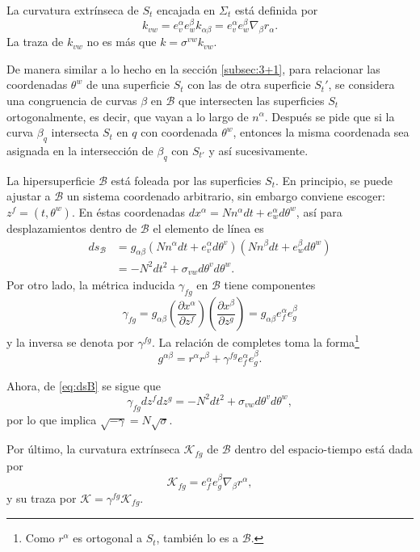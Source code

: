 La curvatura extr\'{i}nseca de $S_{t}$ encajada en $\Sigma_t$ est\'{a} definida por
%
\begin{equation}
\label{eq:extrinseccurvSt}
k_{vw} = e^{\alpha}_{v} e^{\beta}_{w} k_{\alpha \beta} = e^{\alpha}_{v} e^{\beta}_{w} \nabla_{\beta} r_{\alpha}.
\end{equation}
%
La traza de $k_{vw}$ no es m\'{a}s que $k = \sigma^{vw} k_{vw}$.

De manera similar a lo hecho en la secci\'{o}n \ref{subsec:3+1}, para relacionar las coordenadas $\theta^{w}$ de una superficie $S_{t}$ con las de otra superficie $S_{t}'$, se considera una congruencia de curvas $\beta$ en $\mathcal{B}$ que intersecten las superficies $S_{t}$ ortogonalmente, es decir, que vayan a lo largo de $n^{\alpha}$. Despu\'{e}s se pide que si la curva $\beta_{q}$ intersecta $S_{t}$ en $q$ con coordenada $\theta^{w}$, entonces la misma coordenada sea asignada en la intersecci\'{o}n de $\beta_{q}$ con $S_{t'}$ y as\'{i} sucesivamente.

La hipersuperficie $\mathcal{B}$ est\'{a} foleada por las superficies $S_{t}$. En principio, se puede ajustar a $\mathcal{B}$ un sistema coordenado arbitrario, sin embargo conviene escoger: $z^{f} = (t, \theta^{w})$. En \'{e}stas coordenadas $dx^{\alpha} = N n^{\alpha} dt + e^{\alpha}_{w} d \theta^{w}$, as\'{i} para desplazamientos dentro de $\mathcal{B}$ el elemento de l\'{i}nea es
%
\begin{align}
\label{eq:dsB}
ds_{\mathcal{B}} & = g_{\alpha \beta} (N n^{\alpha} dt + e^{\alpha}_{v} d \theta^{v}) (N n^{\beta} dt + e^{\beta}_{w} d \theta^{w}) \nonumber \\
& = - N^{2} dt^{2} + \sigma_{vw} d \theta^{v} d \theta^{w}.
\end{align}
%
Por otro lado, la m\'{e}trica inducida $\gamma_{fg}$ en $\mathcal{B}$ tiene componentes
%
\begin{equation}
\label{eq:indmetricB}
\gamma_{fg} = g_{\alpha \beta} \left( \frac{\partial x^{\alpha}}{\partial z^{f}} \right) \left( \frac{\partial x^{\beta}}{\partial z^{g}} \right) = g_{\alpha \beta} e^{\alpha}_{f} e^{\beta}_{g}
\end{equation}
%
y la inversa se denota por $\gamma^{fg}$. La relaci\'{o}n de completes toma la forma\footnote{Como $r^{\alpha}$ es ortogonal a $S_{t}$, tambi\'{e}n lo es a $\mathcal{B}$.}
%
\begin{equation}
\label{eq:Bcompltrelation}
g^{\alpha \beta} = r^{\alpha} r^{\beta} + \gamma^{fg} e^{\alpha}_{f} e^{\beta}_{g}.
\end{equation}

Ahora, de \eqref{eq:dsB} se sigue que
%
\begin{equation}
\gamma_{fg} dz^{f} dz^{g} =  - N^{2} dt^{2} + \sigma_{vw} d \theta^{v} d \theta^{w},
\end{equation}
%
por lo que implica $\sqrt{-\gamma} = N \sqrt{\sigma}$.

Por \'{u}ltimo,  la curvatura extr\'{i}nseca $\mathcal{K}_{fg}$ de $\mathcal{B}$ dentro del espacio-tiempo est\'{a} dada por
%
\begin{equation}
\mathcal{K}_{fg} = e^{\alpha}_{f} e^{\beta}_{g} \nabla_\beta r^{\alpha},
\end{equation}
%
y su traza por $\mathcal{K} = \gamma^{fg} \mathcal{K}_{fg}$.
